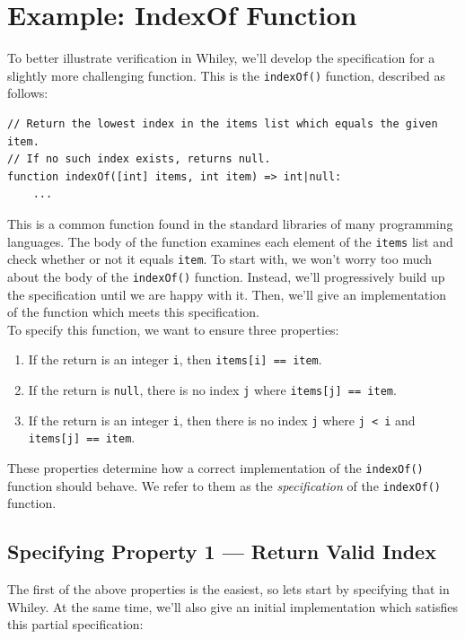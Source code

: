 \newpage
\section{Example: IndexOf Function}

To better illustrate verification in Whiley, we'll develop the
specification for a slightly more challenging function.  This is the
\lstinline{indexOf()} function, described as follows:

\begin{lstlisting}
// Return the lowest index in the items list which equals the given item.
// If no such index exists, returns null.
function indexOf([int] items, int item) => int|null:
    ...
\end{lstlisting}

This is a common function found in the standard libraries of many
programming languages.  The body of the function examines each element
of the \lstinline{items} list and check whether or not it equals
\lstinline{item}.  To start with, we won't worry too much about the
body of the \lstinline{indexOf()} function.  Instead, we'll
progressively build up the specification until we are happy with it.
Then, we'll give an implementation of the function which meets this
specification.\\

\noindent To specify this function, we want to ensure three properties:

\begin{enumerate}
\item If the return is an integer \lstinline{i}, then
  \lstinline{items[i] == item}.
\item If the return is \lstinline{null}, there is no index
  \lstinline{j} where \lstinline{items[j] == item}.
\item If the return is an integer \lstinline{i}, then there is
  no index \lstinline{j} where \lstinline{j < i} and
  \lstinline{items[j] == item}.
\end{enumerate}

These properties determine how a correct implementation of the
\lstinline{indexOf()} function should behave.  We refer to them as the
{\em specification} of the \lstinline{indexOf()} function.

\subsection{Specifying Property 1 --- Return Valid Index}

The first of the above properties is the easiest, so lets start by
specifying that in Whiley.  At the same time, we'll also give an
initial implementation which satisfies this partial specification:


